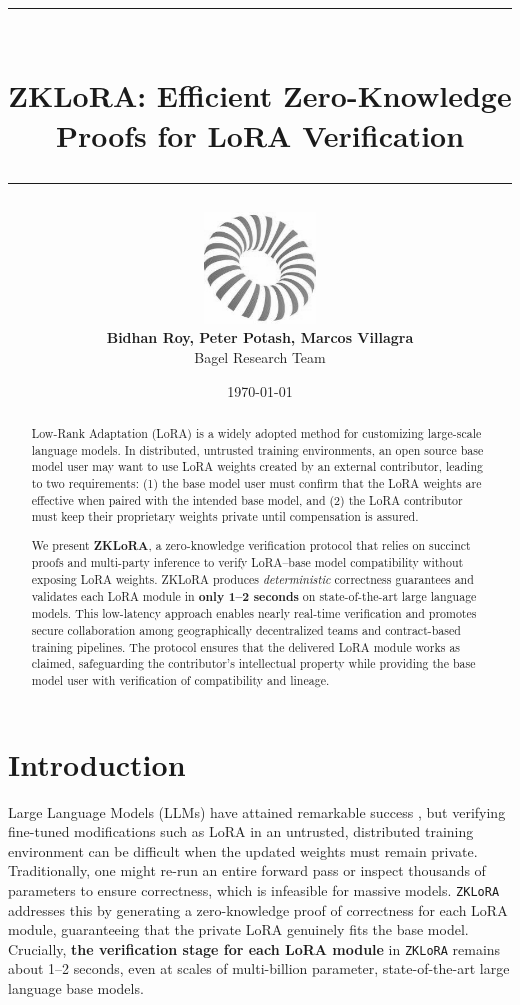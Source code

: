 \documentclass[11pt]{article}
\title{
    \vspace*{-1.5em}
    \rule{\textwidth}{0.4pt} \\[0.4em]
    \textbf{ZKLoRA: Efficient Zero-Knowledge Proofs for LoRA Verification} \\[0.4em]
    \rule{\textwidth}{0.4pt}
}
\author{ \includegraphics[height=8em]{figs/bagel-logo-bw.png} \\
    \textbf{Bidhan Roy, Peter Potash, Marcos Villagra} \\
    Bagel Research Team\footnotemark[1] \\
}
\date{\today}
\begin{document}
\maketitle


\begin{abstract}
  Low-Rank Adaptation (LoRA) is a widely adopted method for customizing large-scale language models. In distributed, untrusted training environments, an open source base model user may want to use LoRA weights created by an external contributor, leading to two requirements: (1) the base model user must confirm that the LoRA weights are effective when paired with the intended base model, and (2) the LoRA contributor must keep their proprietary weights private until compensation is assured.

  We present \textbf{ZKLoRA}, a zero-knowledge verification protocol that relies on succinct proofs and multi-party inference to verify LoRA–base model compatibility without exposing LoRA weights. ZKLoRA produces \emph{deterministic} correctness guarantees and validates each LoRA module in \textbf{only 1--2 seconds} on state-of-the-art large language models. This low-latency approach enables nearly real-time verification and promotes secure collaboration among geographically decentralized teams and contract-based training pipelines. The protocol ensures that the delivered LoRA module works as claimed, safeguarding the contributor’s intellectual property while providing the base model user with verification of compatibility and lineage.
\end{abstract}

\section{Introduction}
Large Language Models (LLMs) have attained remarkable success \cite{brown2020language, devlin2018bert}, but verifying fine-tuned modifications such as LoRA \cite{hu2021lora} in an untrusted, distributed training environment can be difficult when the updated weights must remain private. 
Traditionally, one might re-run an entire forward pass or inspect thousands of parameters to ensure correctness, which is infeasible for massive models. 
\texttt{ZKLoRA} addresses this by generating a zero-knowledge proof of correctness for each LoRA module, guaranteeing that the private LoRA genuinely fits the base model. 
Crucially, \textbf{the verification stage for each LoRA module} in \texttt{ZKLoRA} remains about 1--2 seconds, even at scales of multi-billion parameter, state-of-the-art large language base models.
\end{document}
